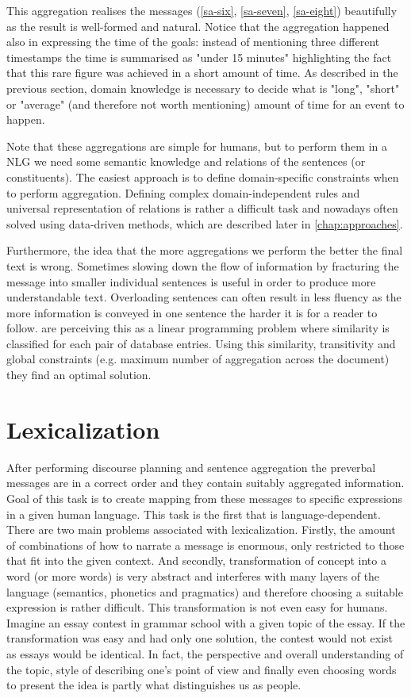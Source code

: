 This aggregation realises the messages (\ref{sa-six}, \ref{sa-seven}, \ref{sa-eight}) beautifully as the result is well-formed and natural. Notice that the aggregation happened also in expressing the time of the goals: instead of mentioning three different timestamps the time is summarised as "under 15 minutes" highlighting the fact that this rare figure was achieved in a short amount of time. As described in the previous section, domain knowledge is necessary to decide what is "long", "short" or "average" (and therefore not worth mentioning) amount of time for an event to happen.

Note that these aggregations are simple for humans, but to perform them in a NLG we need some semantic knowledge and relations of the sentences (or constituents). The easiest approach is to define domain-specific constraints when to perform aggregation. Defining complex domain-independent rules and universal representation of relations is rather a difficult task and nowadays often solved using data-driven methods, which are described later in \autoref{chap:approaches}. 

Furthermore, the idea that the more aggregations we perform the better the final text is wrong. Sometimes slowing down the flow of information by fracturing the message into smaller individual sentences is useful in order to produce more understandable text. Overloading sentences can often result in less fluency as the more information is conveyed in one sentence the harder it is for a reader to follow. \cite{barzilay2006aggregation} are perceiving this as a linear programming problem where similarity is classified for each pair of database entries. Using this similarity, transitivity and global constraints (e.g. maximum number of aggregation across the document) they find an optimal solution.   

\section{Lexicalization}
After performing discourse planning and sentence aggregation the preverbal messages are in a correct order and they contain suitably aggregated information. Goal of this task is to create mapping from these messages to specific expressions in a given human language. This task is the first that is language-dependent. There are two main problems associated with lexicalization. Firstly, the amount of combinations of how to narrate a message is enormous, only restricted to those that fit into the given context. And secondly, transformation of concept into a word (or more words) is very abstract and interferes with many layers of the language (semantics, phonetics and pragmatics) and therefore choosing a suitable expression is rather difficult. This transformation is not even easy for humans. Imagine an essay contest in grammar school with a given topic of the essay. If the transformation was easy and had only one solution, the contest would not exist as essays would be identical. In fact, the perspective and overall understanding of the topic, style of describing one’s point of view and finally even choosing words to present the idea is partly what distinguishes us as people. 

